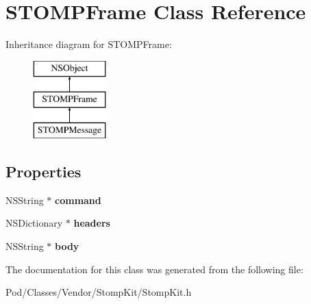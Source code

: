\hypertarget{interface_s_t_o_m_p_frame}{}\section{S\+T\+O\+M\+P\+Frame Class Reference}
\label{interface_s_t_o_m_p_frame}
Inheritance diagram for S\+T\+O\+M\+P\+Frame\+:\begin{figure}[H]
\begin{center}
\leavevmode
\includegraphics[height=3.000000cm]{interface_s_t_o_m_p_frame}
\end{center}
\end{figure}
\subsection*{Properties}
\begin{DoxyCompactItemize}
\item 
N\+S\+String $\ast$ {\bfseries command}\hypertarget{interface_s_t_o_m_p_frame_a01a71cebafcd4b5528e90d84f162443d}{}\label{interface_s_t_o_m_p_frame_a01a71cebafcd4b5528e90d84f162443d}

\item 
N\+S\+Dictionary $\ast$ {\bfseries headers}\hypertarget{interface_s_t_o_m_p_frame_a08d96203bf280c9e9a14be33c8d98025}{}\label{interface_s_t_o_m_p_frame_a08d96203bf280c9e9a14be33c8d98025}

\item 
N\+S\+String $\ast$ {\bfseries body}\hypertarget{interface_s_t_o_m_p_frame_a3c246b29670280d893433083023f242a}{}\label{interface_s_t_o_m_p_frame_a3c246b29670280d893433083023f242a}

\end{DoxyCompactItemize}


The documentation for this class was generated from the following file\+:\begin{DoxyCompactItemize}
\item 
Pod/\+Classes/\+Vendor/\+Stomp\+Kit/Stomp\+Kit.\+h\end{DoxyCompactItemize}
